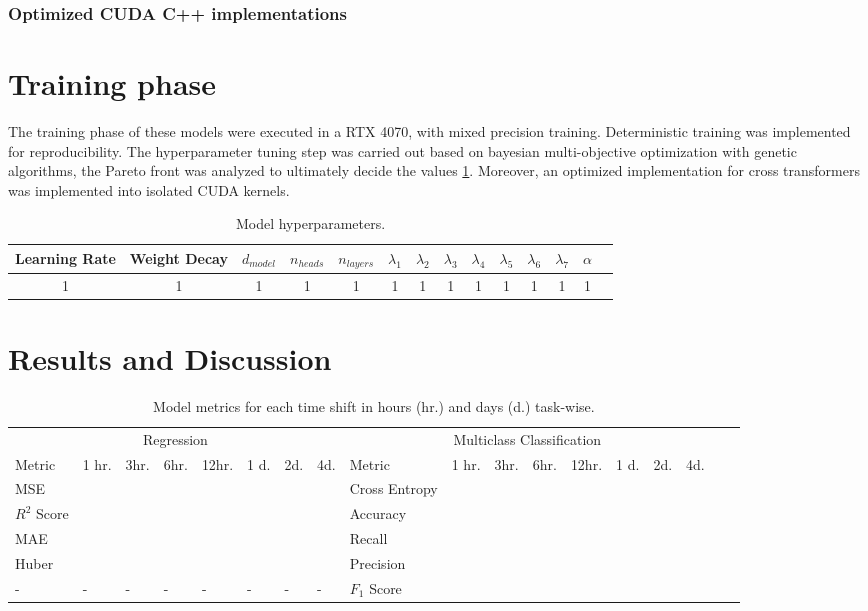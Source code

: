 \documentclass{article}
\begin{document}
\subsubsection{Optimized CUDA C++ implementations}


\section{Training phase}
The training phase of these models were executed in a RTX 4070, with mixed precision training. Deterministic training was implemented for reproducibility. The hyperparameter tuning step was carried out based on bayesian multi-objective optimization with genetic algorithms, the Pareto front was analyzed to ultimately decide the values \ref{tab:table1}. Moreover, an optimized implementation for cross transformers was implemented into isolated CUDA kernels.

\begin{table}[h]
 \caption{Model hyperparameters.}
  \centering
  \begin{tabular}{cccccccccccccc}
    \toprule
    Learning Rate & Weight Decay & $d_{model}$ & $n_{heads}$ & $n_{layers}$ & $\lambda_1$ & $\lambda_2$ & $\lambda_3$ & $\lambda_4$ & $\lambda_5$ & $\lambda_6$ & $\lambda_7$ & $\alpha$\\
    \midrule
    1 & 1 & 1 & 1 & 1 & 1 & 1 & 1 & 1 & 1 & 1 & 1 & 1  \\
    \bottomrule
  \end{tabular}
  \label{tab:table1}
\end{table}

\section{Results and Discussion}
\begin{table}
 \caption{Model metrics for each time shift in hours (hr.) and days (d.)  task-wise.}
  \centering
  \begin{tabular}{llllllllllllllllll}
    \toprule
    \multicolumn{8}{c}{Regression} & \multicolumn{8}{c}{Multiclass Classification} \\
    \cmidrule(r){1-8} \cmidrule(r){9-16}
    Metric     &  1 hr.     & 3hr. & 6hr.& 12hr. & 1 d.& 2d. & 4d. & Metric     &  1 hr.     & 3hr. & 6hr.& 12hr. & 1 d.& 2d. & 4d. \\
    \cmidrule(r){1-1} \cmidrule(r){2-8} \cmidrule(r){9-9} \cmidrule(r){10-16}
    MSE & & & & & & & &Cross Entropy&\\
    $R^2$ Score & & & & & & & & Accuracy&     \\
    MAE  & & & & & & &  &Recall&      \\
    Huber  & & & & & & & &Precision&      \\
     - & - & - & - & - & - & - & - &$F_1$ Score&      \\
    \bottomrule
  \end{tabular}
  \label{tab:table2} \\
\end{table}
\end{document}

